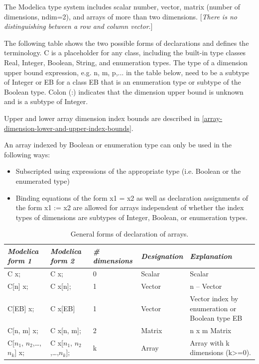 \documentclass[10pt,a4paper]{report}
\begin{document}
The Modelica type system includes scalar number, vector, matrix (number
of dimensions, ndim=2), and arrays of more than two dimensions.
{[}\emph{There is no distinguishing between a row and column vector}.{]}

The following table shows the two possible forms of declarations and
defines the terminology. C is a placeholder for any class, including the
built-in type classes Real, Integer, Boolean, String, and enumeration
types. The type of a dimension upper bound expression, e.g. n, m, p,...
in the table below, need to be a subtype of Integer or EB for a class EB
that is an enumeration type or subtype of the Boolean type. Colon (:)
indicates that the dimension upper bound is unknown and is a subtype of
Integer.

Upper and lower array dimension index bounds are described in \ref{array-dimension-lower-and-upper-index-bounds}.

An array indexed by Boolean or enumeration type can only be used in the
following ways:

\begin{itemize}
\item
  Subscripted using expressions of the appropriate type (i.e. Boolean or
  the enumerated type)
\item
  Binding equations of the form x1 = x2 as well as declaration
  assignments of the form x1 := x2 are allowed for arrays independent of
  whether the index types of dimensions are subtypes of Integer,
  Boolean, or enumeration types.
\end{itemize}

\begin{longtable}{|l|l|l|l|p{3cm}|}
\caption{General forms of declaration of arrays.}\\
\hline
\emph{Modelica form 1} & \emph{Modelica form 2} & \emph{\# dimensions} & \emph{Designation} & \emph{Explanation}\\ \hline
\endhead
C x; & C x; & 0 & Scalar & Scalar\\ \hline
C{[}n{]} x; & C x{[}n{]}; & 1 & Vector & n -- Vector\\ \hline
C{[}EB{]} x; & C x{[}EB{]} & 1 & Vector & Vector index by enumeration or
Boolean type EB\\ \hline
C{[}n, m{]} x; & C x{[}n, m{]}; & 2 & Matrix & n x m
Matrix\\ \hline
C{[}$n_1$, $n_{2}$,\ldots{},$n_k${]} x; & C x{[}$n_1$, $n_2$,\ldots{},$n_k${]}; & k & Array & Array with k dimensions
(k\textgreater{}=0).\\ \hline
\end{longtable}
\end{document}
